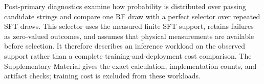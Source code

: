 Post-primary diagnostics examine how probability is distributed over passing
candidate strings and compare one RF draw with a perfect selector over repeated
SFT draws. This selector uses the measured finite SFT support, retains failures
as zero-valued outcomes, and assumes that physical measurements are available
before selection. It therefore describes an inference workload on the observed
support rather than a complete training-and-deployment cost comparison. The
Supplementary Material gives the exact calculation, implementation counts, and
artifact checks; training cost is excluded from these workloads.
